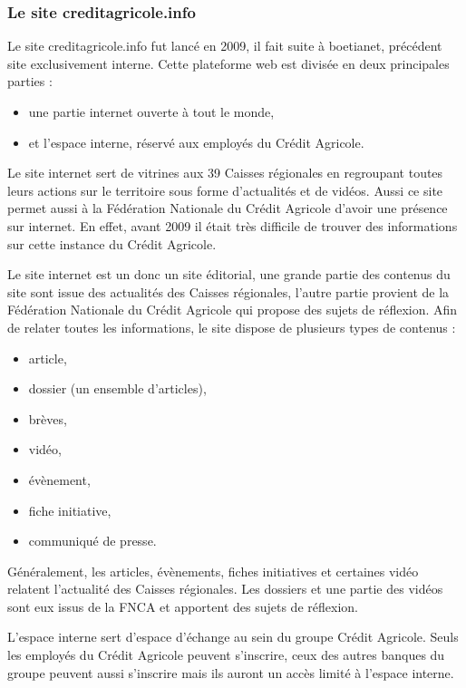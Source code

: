 \documentclass[12pt,a4paper]{article}
\begin{document}
\subsubsection{Le site creditagricole.info}
Le site creditagricole.info fut lancé en 2009, il fait suite à boetianet, précédent site exclusivement interne. Cette plateforme web est divisée en deux principales parties :
\begin{itemize}
\item une partie internet ouverte à tout le monde,
\item et l'espace interne, réservé aux employés du Crédit Agricole.
\end{itemize}\par 
\medskip
Le site internet sert de vitrines aux 39 Caisses régionales en regroupant toutes leurs actions sur le territoire sous forme d'actualités et de vidéos. Aussi ce site permet aussi à la Fédération Nationale du Crédit Agricole d'avoir une présence sur internet. En effet, avant 2009 il était très difficile de trouver des informations sur cette instance du Crédit Agricole.\par
Le site internet est un donc un site éditorial, une grande partie des contenus du site sont issue des actualités des Caisses régionales, l'autre partie provient de la Fédération Nationale du Crédit Agricole qui propose des sujets de réflexion. Afin de relater toutes les informations, le site dispose de plusieurs types de contenus :
\begin{itemize}
\item article,
\item dossier (un ensemble d'articles),
\item brèves,
\item vidéo,
\item évènement,
\item fiche initiative,
\item communiqué de presse.
\end{itemize}\par
Généralement, les articles, évènements, fiches initiatives et certaines vidéo relatent l'actualité des Caisses régionales. Les dossiers et une partie des vidéos sont eux issus de la FNCA et apportent des sujets de réflexion.\par
\bigskip
L'espace interne sert d'espace d'échange au sein du groupe Crédit Agricole. Seuls les employés du Crédit Agricole peuvent s'inscrire, ceux des autres banques du groupe peuvent aussi s'inscrire mais ils auront un accès limité à l'espace interne.\par 
\end{document}
